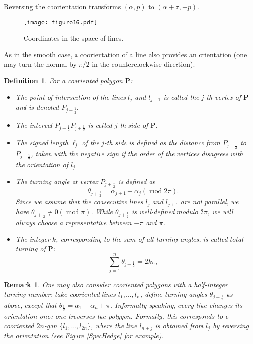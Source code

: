 \documentclass[12pt]{article}
\newtheorem{remark}[lemma]{Remark}
\newtheorem{definition}[lemma]{Definition}
\renewcommand{\P}{\mathbf{P}}
\renewcommand{\mod}{\operatorname{mod}}
\begin{document}
Reversing the coorientation transforms $(\alpha, p)$ to $(\alpha + \pi, -p)$.

\begin{figure}[hbtp]
\centering
\texttt{[image: figure16.pdf]}
\caption{Coordinates in the space of lines.}
\label{lines}
\end{figure}

As in the smooth case, a coorientation of a line also provides an orientation (one may turn the normal by $\pi/2$ in the counterclockwise direction).

\begin{definition} \label{polygon} For a cooriented polygon $\P$:
\begin{itemize}
\item The point of intersection of the lines $l_j$ and $l_{j+1}$ is called the \emph{$j$-th vertex} of $\P$ and is denoted $P_{j+\frac12}$.	
\item The interval $P_{j-\frac12} P_{j+\frac12}$ is called \emph{$j$-th side} of $\P$.	
\item The \emph{signed length} $\ell_j$ of the $j$-th side is defined as the distance from $P_{j-\frac12}$ to $P_{j+\frac12}$, taken with the negative sign if the order of the vertices disagrees with the orientation of $l_j$.	
\item The \emph{turning angle} at  vertex $P_{j+\frac12}$ is defined as
\begin{equation}
\label{SmallTurn}
\theta_{j+\frac12} = \alpha_{j+1} - \alpha_j (\mod{2\pi}).
\end{equation}
Since we assume that the consecutive lines $l_j$ and $l_{j+1}$ are not parallel, we have $\theta_{j+\frac12} \not\equiv 0 (\mod \pi)$. While $\theta_{j+\frac12}$ is well-defined modulo $2\pi$, we will always choose a representative between $-\pi$ and $\pi$.	
\item The integer $k$, corresponding to the sum of all turning angles, is called \emph{total turning} of $\P$:
\[
\sum_{j=1}^n \theta_{j+\frac12} = 2k\pi,
\]
\end{itemize}  
\end{definition}

\begin{remark}
\label{HalfInt}
{\rm One may also consider cooriented polygons with a half-integer turning number: take cooriented lines $l_1, \ldots, l_n$, define turning angles $\theta_{j+\frac12}$ as above, except that $\theta_{\frac12} = \alpha_1 - \alpha_n + \pi$. Informally speaking, every line changes its orientation once one traverses the polygon. Formally,  this corresponds to a cooriented $2n$-gon $\{l_1, \ldots, l_{2n}\}$, where the line $l_{n+j}$ is obtained from $l_j$ by reversing the orientation (see Figure \ref{SpecHedge} for example).
}
\end{remark}
\end{document}
